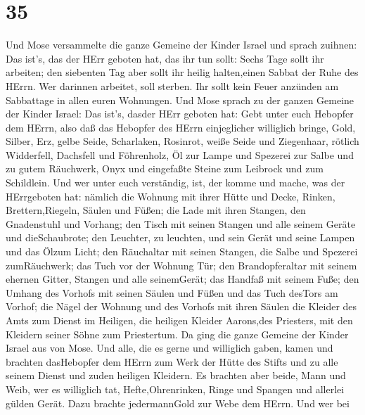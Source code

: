 \hypertarget{section-34}{%
\section{35}\label{section-34}}

 Und Mose versammelte die ganze Gemeine der Kinder Israel
und sprach zuihnen: Das ist's, das der HErr geboten hat, das ihr tun
sollt:  Sechs Tage sollt ihr arbeiten; den siebenten Tag
aber sollt ihr heilig halten,einen Sabbat der Ruhe des HErrn. Wer
darinnen arbeitet, soll sterben.  Ihr sollt kein Feuer
anzünden am Sabbattage in allen euren Wohnungen.  Und Mose
sprach zu der ganzen Gemeine der Kinder Israel: Das ist's, dasder HErr
geboten hat:  Gebt unter euch Hebopfer dem HErrn, also daß
das Hebopfer des HErrn einjeglicher williglich bringe, Gold, Silber,
Erz,  gelbe Seide, Scharlaken, Rosinrot, weiße Seide und
Ziegenhaar,  rötlich Widderfell, Dachsfell und Föhrenholz,
 Öl zur Lampe und Spezerei zur Salbe und zu gutem Räuchwerk,
 Onyx und eingefaßte Steine zum Leibrock und zum Schildlein.
 Und wer unter euch verständig, ist, der komme und mache,
was der HErrgeboten hat:  nämlich die Wohnung mit ihrer
Hütte und Decke, Rinken, Brettern,Riegeln, Säulen und Füßen;
 die Lade mit ihren Stangen, den Gnadenstuhl und Vorhang;
 den Tisch mit seinen Stangen und alle seinem Geräte und
dieSchaubrote;  den Leuchter, zu leuchten, und sein Gerät
und seine Lampen und das Ölzum Licht;  den Räuchaltar mit
seinen Stangen, die Salbe und Spezerei zumRäuchwerk; das Tuch vor der
Wohnung Tür;  den Brandopferaltar mit seinem ehernen
Gitter, Stangen und alle seinemGerät; das Handfaß mit seinem Fuße;
 den Umhang des Vorhofs mit seinen Säulen und Füßen und das
Tuch desTors am Vorhof;  die Nägel der Wohnung und des
Vorhofs mit ihren Säulen  die Kleider des Amts zum Dienst
im Heiligen, die heiligen Kleider Aarons,des Priesters, mit den Kleidern
seiner Söhne zum Priestertum.  Da ging die ganze Gemeine
der Kinder Israel aus von Mose.  Und alle, die es gerne und
williglich gaben, kamen und brachten dasHebopfer dem HErrn zum Werk der
Hütte des Stifts und zu alle seinem Dienst und zuden heiligen Kleidern.
 Es brachten aber beide, Mann und Weib, wer es williglich
tat, Hefte,Ohrenrinken, Ringe und Spangen und allerlei gülden Gerät.
Dazu brachte jedermannGold zur Webe dem HErrn.  Und wer bei
